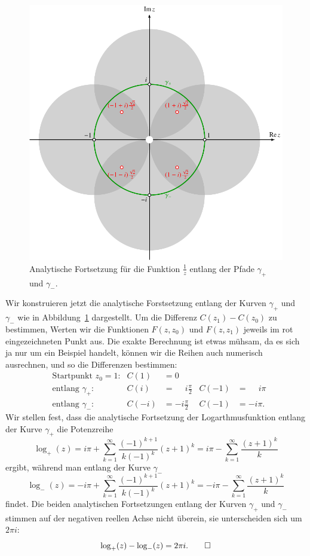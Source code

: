 \begin{beispiel}
\begin{figure}
\centering
\includegraphics{chapters/080-funktionentheorie/images/fortsetzreziprok.pdf}
\caption{Analytische Fortsetzung für die Funktion $\frac1z$
entlang der Pfade $\gamma_+$ und $\gamma_-$.
\label{komplex:logfortsetzung}}
\end{figure}
Wir konstruieren jetzt die analytische Forstsetzung entlang der Kurven
$\gamma_+$ und $\gamma_-$ wie in Abbildung~\ref{komplex:logfortsetzung}
dargestellt.
Um die Differenz $C(z_1)-C(z_0)$ zu bestimmen, Werten wir die Funktionen
$F(z,z_0)$ und $F(z,z_1)$ jeweils im rot eingezeichneten Punkt aus.
Die exakte Berechnung ist etwas mühsam, da es sich ja nur um ein Beispiel
handelt, können wir die Reihen auch numerisch ausrechnen, und so die
Differenzen bestimmen:
\begin{align*}
&\text{Startpunkt $z_0=1$:}& C(1)&=0             &       &       \\
&\text{entlang $\gamma_+$:}& C(i)&=\phantom{-}i\frac{\pi}2 & C(-1) &=\phantom{-}i\pi\\
&\text{entlang $\gamma_-$:}&C(-i)&=-i\frac{\pi}2 & C(-1) &= -i\pi.
\end{align*}
Wir stellen fest, dass die analytische Fortsetzung der Logarthmusfunktion
entlang der Kurve $\gamma_+$ die Potenzreihe
\[
\log_+(z)
=
i\pi +\sum_{k=1}^\infty \frac{(-1)^{k+1}}{k(-1)^k}(z+1)^k
=
i\pi
-
\sum_{k=1}^\infty \frac{(z+1)^k}{k}
\]
ergibt, während man entlang der  Kurve $\gamma_-$
\[
\log_-(z)
=
-i\pi +\sum_{k=1}^\infty \frac{(-1)^{k+1}}{k(-1)^k}(z+1)^k
=
-i\pi
-
\sum_{k=1}^\infty \frac{(z+1)^k}{k}
\]
findet.
Die beiden analytischen Fortsetzungen entlang der Kurven $\gamma_+$ und
$\gamma_-$ stimmen auf der negativen reellen Achse nicht überein,
sie unterscheiden sich um $2\pi i$:
\[
\log_+(z)-\log_-(z)=2\pi i.
\qedhere
\]
\end{beispiel}

